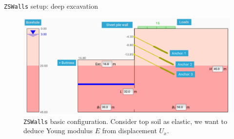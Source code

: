 \documentclass[dvipsnames]{beamer}
\begin{document}
	\begin{frame}{\texttt{ZSWalls} setup: deep excavation}
	\begin{figure}
	\includegraphics[width=\textwidth]{images/zswalls_setup.png}
	\caption{\texttt{ZSWalls} basic configuration. Consider top soil as elastic, we want to deduce Young modulus $E$ from displacement $U_x$.}
	\end{figure}
	\end{frame}
	
\end{document}
